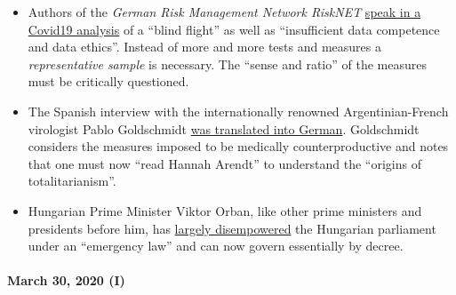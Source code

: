 \begin{itemize}
{  matter}``, which could indicate political pressure, as an NPR
  journalist noted. Independent of this study, however, the
  unreliability of so-called PCR virus tests has long been known: In
  2003, for example, a mass infection in a Canadian nursing home with
  SARS corona viruses was ``found'', which later
  \href{https://www.ncbi.nlm.nih.gov/pmc/articles/PMC2095096/}{turned
  out to be} common cold corona viruses (which can also be fatal for
  risk groups).
\item
  Authors of the \emph{German Risk Management Network RiskNET}
  \href{https://www.risknet.de/themen/risknews/covid-19-und-der-blindflug/}{speak
  in a Covid19 analysis} of a ``blind flight'' as well as ``insufficient
  data competence and data ethics''. Instead of more and more tests and
  measures a \emph{representative sample} is necessary. The ``sense and
  ratio'' of the measures must be critically questioned.
\item
  The Spanish interview with the internationally renowned
  Argentinian-French virologist Pablo Goldschmidt
  \href{https://www.rubikon.news/artikel/der-corona-totalitarismus}{was
  translated into German}. Goldschmidt considers the measures imposed to
  be medically counterproductive and notes that one must now ``read
  Hannah Arendt'' to understand the ``origins of totalitarianism''.
\item
  Hungarian Prime Minister Viktor Orban, like other prime ministers and
  presidents before him, has \href{https://www.krone.at/2127086}{largely
  disempowered} the Hungarian parliament under an ``emergency law'' and
  can now govern essentially by decree.
\end{itemize}

\hypertarget{march-30-2020-i}{%
\paragraph{March 30, 2020 (I)}\label{march-30-2020-i}}

